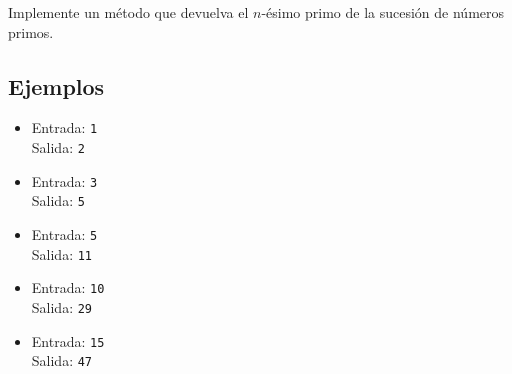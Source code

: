 Implemente un método que devuelva el $n$-ésimo primo de la sucesión de números primos.
\subsection*{Ejemplos}
\begin{itemize} 
    \item Entrada: \texttt{1}\\ 
    Salida: \texttt{2}
    \item Entrada: \texttt{3}\\
    Salida: \texttt{5}

    \item Entrada: \texttt{5}\\
          Salida: \texttt{11}
    
    \item Entrada: \texttt{10}\\
          Salida: \texttt{29}
    
    \item Entrada: \texttt{15}\\
          Salida: \texttt{47}
\end{itemize}